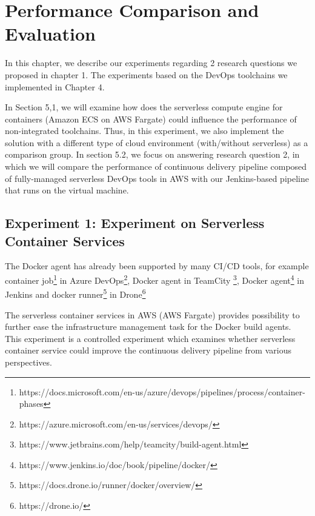 \chapter{Performance Comparison and Evaluation}
In this chapter, we describe our experiments regarding 2 research questions we proposed in chapter 1. The experiments based on the DevOps toolchains we implemented in Chapter 4.
\par
In Section 5,1, we will examine how does the serverless compute engine for containers (Amazon ECS on AWS Fargate) could influence the performance of non-integrated toolchains. Thus, in this experiment, we also implement the solution with a different type of cloud environment (with/without serverless) as a comparison group.
In section 5.2, we focus on answering research question 2, in which we will compare the performance of continuous delivery pipeline composed of fully-managed serverless DevOps tools in AWS with our Jenkins-based pipeline that runs on the virtual machine.
\section{Experiment 1: Experiment on Serverless Container Services}
The Docker agent has already been supported by many CI/CD tools, for example container job\footnote{https://docs.microsoft.com/en-us/azure/devops/pipelines/process/container-phases} in Azure DevOps\footnote{https://azure.microsoft.com/en-us/services/devops/}, Docker agent in TeamCity \footnote{https://www.jetbrains.com/help/teamcity/build-agent.html}, Docker agent\footnote{https://www.jenkins.io/doc/book/pipeline/docker/} in Jenkins and docker runner\footnote{https://docs.drone.io/runner/docker/overview/} in Drone\footnote{https://drone.io/}
\par
The serverless container services in AWS (AWS Fargate) provides possibility to further ease the infrastructure management task for the Docker build agents.
This experiment is a controlled experiment which examines whether serverless container service could improve the continuous delivery pipeline from various perspectives.
